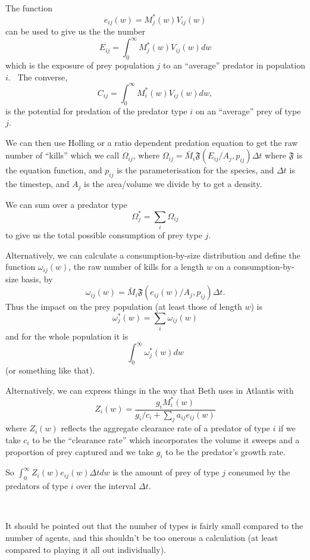 \documentclass{article}
\begin{document}
\

The function
\[ e_{i j} (w) = M^{\ast}_j (w) V_{i j} (w)  \]
can be used to give us the the number
\[ E_{i j} = \int_0^{\infty} M^{\ast}_j (w) V_{i j} (w) d w \]
which is the exposure of prey population $j$ to an ``average'' predator in
population $i$. \ The converse,
\[ C_{i j} = \int_0^{\infty} M_i^{\ast} (w) V_{i j} (w) d w, \]
is the potential for predation of the predator type $i$ on an ``average'' prey
of type $j$.

We can then use Holling or a ratio dependent predation equation to get the
raw number of ``kills'' which we call $\Omega_{i j}$, where $\Omega_{i j} =
\bar{M}_i \mathfrak{F} (E_{i j} / A_j, p_{i j}) \Delta t$ where $\mathfrak{F}$
is the equation function, and $p_{i j}$ is the parameterisation for the
species, and $\Delta t$ is the timestep, and $A_j$ is the area/volume we
divide by to get a density. \

We can sum over a predator type
\[ \Omega_j^{\ast} = \sum_i \Omega_{i j} \]
to give us the total possible consumption of prey type $j$. \

Alternatively, we can calculate a consumption-by-size distribution and define
the function $\omega_{i j} (w)$, the raw number of kills for a length $w$ on a
consumption-by-size basis, by
\[ \omega_{i j} (w) = \bar{M}_i \mathfrak{F} (e_{i j} (w) / A_j, p_{i j})
   \Delta t. \]
Thus the impact on the prey population (at least those of length $w$) is
\[ \omega_j^{\ast} (w) = \sum_i \omega_{i j} (w) \]
and for the whole population it is
\[ \int_0^{\infty} \omega^{\ast}_j (w) d w \]
(or something like that).

Alternatively, we can express things in the way that Beth uses in Atlantis
with
\[ Z_i (w) = \frac{g_i M^{\ast}_i (w)}{g_i / c_i + \sum_j a_{i j} e_{i j} (w)}
\]
where $Z_i (w)$ reflects the aggregate clearance rate of a predator of type
$i$ if we take $c_i$ to be the ``clearance rate'' which incorporates the
volume it sweeps and a proportion of prey captured and we take $g_i$ to be the
predator's growth rate.

So $\int_0^{\infty} Z_i (w) e_{i j} (w) \Delta t d w$ is the amount of prey of
type $j$ consumed by the predators of type $i$ over the interval $\Delta t$.

\

It should be pointed out that the number of types is fairly small compared to
the number of agents, and this shouldn't be too onerous a calculation (at
least compared to playing it all out individually).
\end{document}
